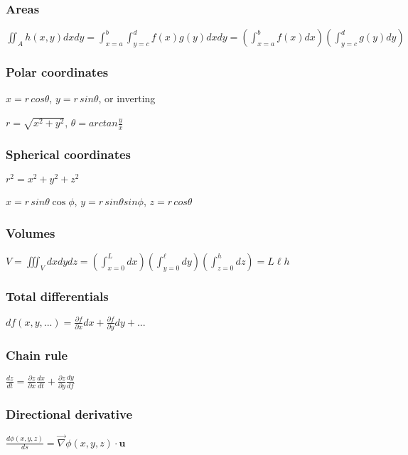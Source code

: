 \documentclass{article}
\author{ @usercdp }
\date{June 2023}
\begin{document}
\subsubsection{Areas}
$\displaystyle\iint_A h(x,y) dx dy = \displaystyle\int_{x=a}^b\int_{y=c}^d f(x)g(y) dxdy=\left(\displaystyle\int_{x=a}^b f(x)dx\right)\left(\displaystyle\int_{y=c}^d g(y)dy\right)$

\subsubsection{Polar coordinates}
$x = r\,cos\theta$, $y=r\,sin\theta$, or inverting

\vspace{5pt}

\noindent$r=\sqrt{x^2+y^2}$, $\theta=arctan\frac{y}{x}$

\subsubsection{Spherical coordinates}
$r^2=x^2+y^2+z^2$

\vspace{5pt}

\noindent$x=r\,sin\theta\cos\phi$, $y=r\,sin\theta sin\phi$, $z=r\,cos\theta$

\subsubsection{Volumes}
$V = \displaystyle\iiint_V dx dy dz = \left(\displaystyle\int_{x=0}^L dx\right)\left(\displaystyle\int_{y=0}^\ell dy\right)\left(\displaystyle\int_{z=0}^h dz\right)=L\ell h$

\subsubsection{Total differentials}
$df(x,y,...)=\frac{\partial f}{\partial x}dx+\frac{\partial f}{\partial y}dy+...$

\subsubsection{Chain rule}
$\frac{dz}{dt}=\frac{\partial z}{\partial x} \frac{dx}{dt}+\frac{\partial z}{\partial y}\frac{dy}{df}$

\subsubsection{Directional derivative}
$\frac{d\phi(x,y,z)}{ds}=\overrightarrow{\nabla}\phi(x,y,z)\cdot\mathbf{u}$
\end{document}
